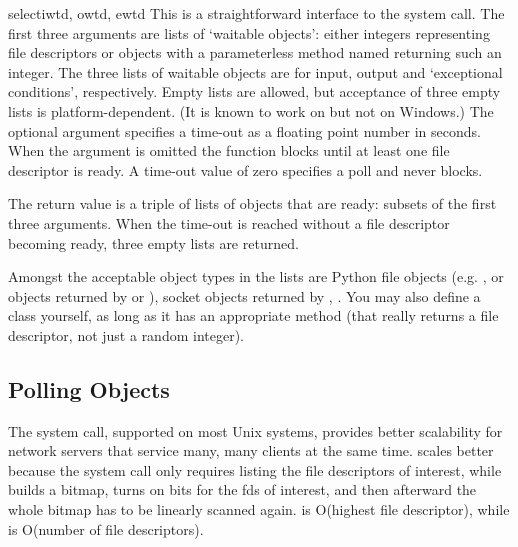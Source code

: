 \begin{funcdesc}{select}{iwtd, owtd, ewtd}
This is a straightforward interface to the \UNIX{} 
system call.  The first three arguments are lists of `waitable
objects': either integers representing file descriptors or
objects with a parameterless method named  returning
such an integer.  The three lists of waitable objects are for input,
output and `exceptional conditions', respectively.  Empty lists are
allowed, but acceptance of three empty lists is platform-dependent.
(It is known to work on \UNIX{} but not on Windows.)  The optional
 argument specifies a time-out as a floating point number
in seconds.  When the  argument is omitted the function
blocks until at least one file descriptor is ready.  A time-out value
of zero specifies a poll and never blocks.

The return value is a triple of lists of objects that are ready:
subsets of the first three arguments.  When the time-out is reached
without a file descriptor becoming ready, three empty lists are
returned.

Amongst the acceptable object types in the lists are Python file
objects (e.g. , or objects returned by
 or ), socket objects
returned by ,%
.
You may also define a  class yourself, as long as it has
an appropriate  method (that really returns a file
descriptor, not just a random integer).
\end{funcdesc}

\subsection{Polling Objects
            \label{poll-objects}}

The  system call, supported on most Unix systems,
provides better scalability for network servers that service many,
many clients at the same time.
 scales better because the system call only
requires listing the file descriptors of interest, while 
builds a bitmap, turns on bits for the fds of interest, and then
afterward the whole bitmap has to be linearly scanned again.
 is O(highest file descriptor), while
 is O(number of file descriptors).

